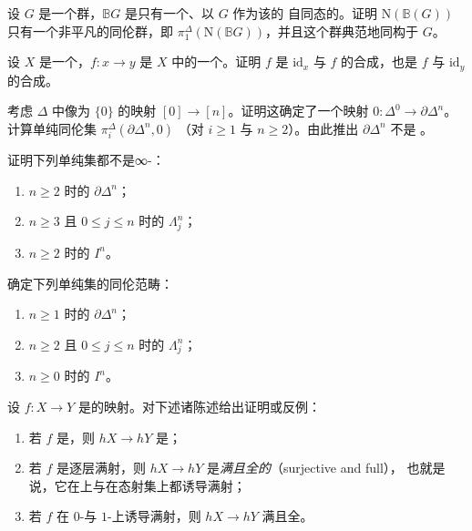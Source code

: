 \begin{exercise}\label{ex:bg-homotopy-groups}
设 $G$ 是一个群，$\mathbb{B}G$ 是只有一个\trObject{}、以 $G$ 作为该\trObject{}的
自同态的\trCategory{}。证明 $\mathrm{N}(\mathbb{B}(G))$ 只有一个非平凡的同伦群，即
$\pi^{\Delta}_1(\mathrm{N}(\mathbb{B}G))$，并且这个群典范地同构于 $G$。
\end{exercise}

\begin{exercise}\label{ex:composer-identity-composition}
设 $X$ 是一个\trComposer{}，$f\colon x \to y$ 是 $X$ 中的一个\trMorphism{}。证明 $f$
是 $\mathrm{id}_x$ 与 $f$ 的合成，也是 $f$ 与 $\mathrm{id}_y$ 的合成。
\end{exercise}

\begin{exercise}\label{ex:boundary-not-kan}
考虑 $\Delta$ 中像为 $\{0\}$ 的映射 $[0] \to [n]$。证明这确定了一个映射
$0\colon \Delta^0 \to \partial\Delta^n$。计算单纯同伦集 $\pi^{\Delta}_i(\partial\Delta^n, 0)$
（对 $i \ge 1$ 与 $n \ge 2$）。由此推出 $\partial\Delta^n$ 不是 \trKanComplex{}。
\end{exercise}

\begin{exercise}\label{ex:not-infinity-categories}
证明下列单纯集都不是∞-\trCategories{}：
\begin{enumerate}[label=(\arabic*)]
  \item $n \ge 2$ 时的 $\partial\Delta^n$；
  \item $n \ge 3$ 且 $0 \le j \le n$ 时的 $\Lambda^n_j$；
  \item $n \ge 2$ 时的 $I^n$。
\end{enumerate}
\end{exercise}

\begin{exercise}\label{ex:homotopy-categories-of-standard-examples}
确定下列单纯集的同伦范畴：
\begin{enumerate}[label=(\arabic*)]
  \item $n \ge 1$ 时的 $\partial\Delta^n$；
  \item $n \ge 2$ 且 $0 \le j \le n$ 时的 $\Lambda^n_j$；
  \item $n \ge 0$ 时的 $I^n$。
\end{enumerate}
\end{exercise}

\begin{exercise}\label{ex:homotopy-category-functoriality-failures}
设 $f\colon X \to Y$ 是\trSimplicialSet{}的映射。对下述诸陈述给出证明或反例：
\begin{enumerate}[label=(\arabic*)]
  \item 若 $f$ 是\trMonomorphism{}，则 $hX \to hY$ 是\trFullyFaithful{}；
  \item 若 $f$ 是逐层满射，则 $hX \to hY$ 是\emph{满且全的}（surjective and full），
        也就是说，它在\trObject{}上与在态射集上都诱导满射；
  \item 若 $f$ 在 $0$-\trSimplex{}与 $1$-\trSimplex{}上诱导满射，则
        $hX \to hY$ 满且全。
\end{enumerate}
\end{exercise}

